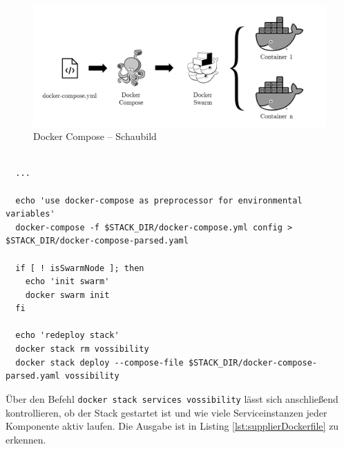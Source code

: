 \begin{figure}[ht!]
	\centering
	\includegraphics[width=.95\linewidth]{kapitel/problemloesung/implementierung/_img/stack-compose}
	\caption[Docker Compose -- Schaubild]{Docker Compose -- Schaubild}
	\label{fig:dockerComposeOverview}
\end{figure}

\begin{lstlisting}[style=bashStyle,caption={start-stack-services.sh},label=lst:summary-start-stack-services]

  ...

  echo 'use docker-compose as preprocessor for environmental variables'
  docker-compose -f $STACK_DIR/docker-compose.yml config > $STACK_DIR/docker-compose-parsed.yaml

  if [ ! isSwarmNode ]; then
    echo 'init swarm'
    docker swarm init
  fi

  echo 'redeploy stack'
  docker stack rm vossibility
  docker stack deploy --compose-file $STACK_DIR/docker-compose-parsed.yaml vossibility
\end{lstlisting}

Über den Befehl \verb+docker stack services vossibility+ lässt sich anschließend kontrollieren, ob der Stack gestartet ist und wie viele Serviceinstanzen jeder Komponente aktiv laufen. Die Ausgabe ist in Listing \ref{lst:supplierDockerfile} zu erkennen.

